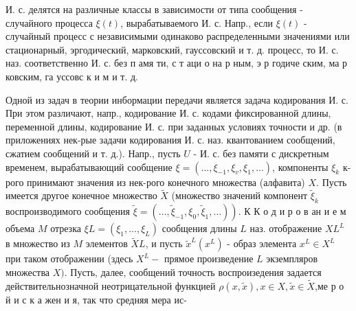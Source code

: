 \documentclass[10pt]{article}
\begin{document}
И. с. делятся на различные классы в зависимости от типа сообщения - случайного процесса $\xi(t)$, вырабатываемого И. с. Напр., если $\xi(t)$ - случайный процесс с независимыми одинаково распределенными значениями или стационарный, эргодический, марковский, гауссовский и т. д. процесс, то И. с. наз. соответственно И. с. без п амя ти, с т аци о на р ным, э р годиче ским, ма р ковским, га уссовс к и м и т. д.



Одной из задач в теории инбормации передачи является задача кодирования И. с. При этом различают, напр., кодирование И. с. кодами фиксированной длины, переменной длины, кодирование И. с. при заданных условиях точности и др. (в приложениях нек-рые задачи кодирования И. с. наз. квантованием сообщений, сжатием сообщений и т. д.). Напр., пусть $U$ - И. с. без памяти с дискретным временем, вырабатывающий сообщение $\xi=\left(\ldots, \xi_{-1}, \xi_{v}, \xi_{1}, \ldots\right)$, компоненты $\xi_{k}$ к-рого принимают значения из нек-рого конечного множества (алфавита) $X$. Пусть имеется другое конечное множество $\tilde{X}$ (множество значений компонент $\tilde{\xi}_{k}$ воспроизводимого сообщения $\left.\tilde{\xi}=\left(\ldots, \tilde{\xi}_{-1}, \xi_{0}, \tilde{\xi}_{1}, \ldots\right)\right)$. К К о д и р о в ан и е м объема $M$ отрезка $\xi L=\left(\xi_{1}, \ldots, \xi_{L}\right)$ сообщения длины $L$ наз. отображение $X L^{L}$ в множество из $M$ элементов $\tilde{X} L$, и пусть $\tilde{x}^{L}\left(x^{L}\right)$ - образ элемента $x^{L} \in X^{L}$ при таком отображении (здесь $X^{L}-$ прямое произведение $L$ экземпляров множества $X)$. Пусть, далее, сообщений точность воспроизедения задается действительнозначной неотрицательной функцией $\rho(x, \tilde{x}), x \in X, \tilde{x} \in \tilde{X}$,ме р о й и с к а жен и я, так что средняя мера ис-
\end{document}

